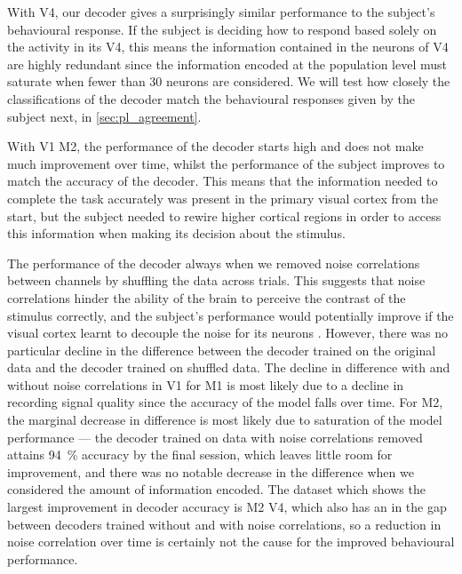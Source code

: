 With \ac{V4}, our decoder gives a surprisingly similar performance to the subject's behavioural response.
If the subject is deciding how to respond based solely on the activity in its \ac{V4}, this means the information contained in the neurons of \ac{V4} are highly redundant since the information encoded at the population level must saturate when fewer than \num{30} neurons are considered.
We will test how closely the classifications of the decoder match the behavioural responses given by the subject next, in \autoref{sec:pl_agreement}.

With \ac{V1} \ac{M2}, the performance of the decoder starts high and does not make much improvement over time, whilst the performance of the subject improves to match the accuracy of the decoder.
This means that the information needed to complete the task accurately was present in the primary visual cortex from the start, but the subject needed to rewire higher cortical regions in order to access this information when making its decision about the stimulus.

The performance of the decoder always  when we removed noise correlations between channels by shuffling the data across trials.
This suggests that noise correlations hinder the ability of the brain to perceive the contrast of the stimulus correctly, and the subject's performance would potentially improve if the visual cortex learnt to decouple the noise for its neurons \citep{Cohen2008}.
However, there was no particular decline in the difference between the decoder trained on the original data and the decoder trained on shuffled data.
The decline in difference with and without noise correlations in \ac{V1} for \ac{M1} is most likely due to a decline in recording signal quality since the accuracy of the model falls over time.
For \ac{M2}, the marginal decrease in difference is most likely due to saturation of the model performance --- the decoder trained on data with noise correlations removed attains \SI{94}{\percent} accuracy by the final session, which leaves little room for improvement, and there was no notable decrease in the difference when we considered the amount of information encoded.
The dataset which shows the largest improvement in decoder accuracy is \ac{M2} \ac{V4}, which also has an  in the gap between decoders trained without and with noise correlations, so a reduction in noise correlation over time is certainly not the cause for the improved behavioural performance.


